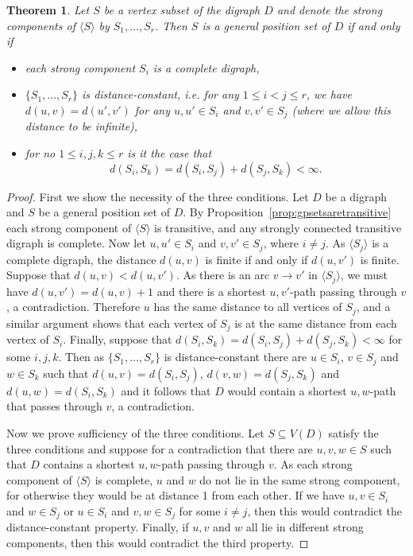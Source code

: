 \documentclass[a4paper,12pt]{article}
\newtheorem{theorem}{Theorem}[section]
\theoremstyle{definition}
\begin{document}
	\begin{theorem}\label{thm:characterisation}
		Let $S$ be a vertex subset of the digraph $D$ and denote the strong components of $\langle S \rangle $ by $S_1,\ldots,S_r$. Then $S$ is a general position set of $D$ if and only if 
		\begin{itemize}
			\item each strong component $S_i$ is a complete digraph, 
			\item $\{ S_1,\dots ,S_r\} $ is \emph{distance-constant}, i.e. for any $1 \leq i < j \leq r$, we have $d(u,v) = d(u',v')$ for any $u,u' \in S_i$ and $v,v' \in S_j$ (where we allow this distance to be infinite),
			\item for no $1 \leq i,j,k \leq r$ is it the case that \[ d(S_i,S_k) = d(S_i,S_j)+d(S_j,S_k) < \infty .\]
		\end{itemize} 
	\end{theorem}
	\begin{proof}
		First we show the necessity of the three conditions. Let $D$ be a digraph and $S$ be a general position set of $D$. By Proposition~\ref{prop:gpsetsaretransitive} each strong component of $\langle S\rangle$ is transitive, and any strongly connected transitive digraph is complete. Now let $u,u' \in S_i$ and $v,v' \in S_j$, where $i \neq j$. As $\langle S_j\rangle$ is a complete digraph, the distance $d(u,v)$ is finite if and only if $d(u,v')$ is finite. Suppose that $d(u,v) < d(u,v')$. As there is an arc $v \rightarrow v'$ in $\langle S_j\rangle$, we must have $d(u,v') = d(u,v)+1$ and there is a shortest $u,v'$-path passing through $v$, a contradiction. Therefore $u$ has the same distance to all vertices of $S_j$, and a similar argument shows that each vertex of $S_j$ is at the same distance from each vertex of $S_i$.  Finally, suppose that $d(S_i,S_k) = d(S_i,S_j)+d(S_j,S_k) < \infty $ for some $i,j,k$. Then as $\{ S_1,\dots ,S_r\} $ is distance-constant there are $u \in S_i$, $v \in S_j$ and $w \in S_k$ such that $d(u,v) = d(S_i,S_j)$, $d(v,w) = d(S_j,S_k)$ and $d(u,w) = d(S_i,S_k)$ and it follows that $D$ would contain a shortest $u,w$-path that passes through $v$, a contradiction.
		
		Now we prove sufficiency of the three conditions. Let $S \subseteq V(D)$ satisfy the three conditions and suppose for a contradiction that there are $u,v,w \in S$ such that $D$ contains a shortest $u,w$-path passing through $v$. As each strong component of $\langle S\rangle$ is complete, $u$ and $w$ do not lie in the same strong component, for otherwise they would be at distance 1 from each other. If we have $u,v \in S_i$ and $w \in S_j$ or $u \in S_i$ and $v,w \in S_j$ for some $i \neq j$, then this would contradict the distance-constant property. Finally, if $u,v$ and $w$ all lie in different strong components, then this would contradict the third property.
	\end{proof}
	
\end{document}
